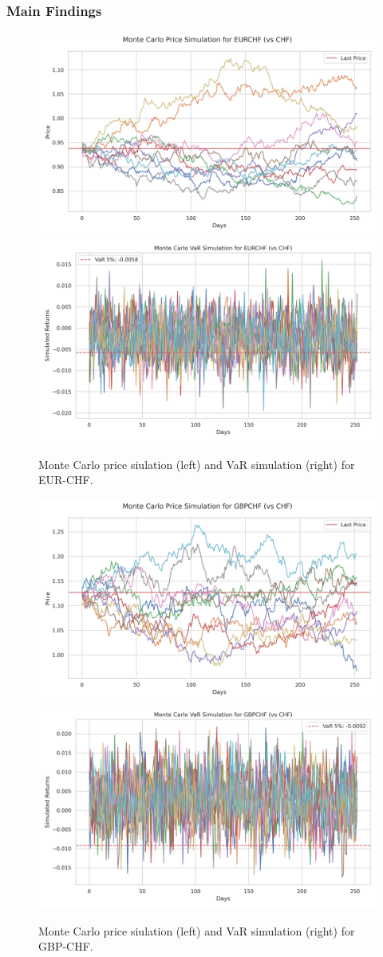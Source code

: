 \documentclass[10pt]{beamer}
\begin{document}
\begin{frame}
\frametitle{Main Findings}
\begin{figure}
    \centering  \includegraphics[width=0.48\linewidth]{reports/figures/monte_carlo_price_simulation_EURCHF_vs_CHF.png}  \label{fig:monte_carlo_price_simulation_EURCHF_vs_CHF}
    \includegraphics[width=0.48\linewidth]{reports/figures/monte_carlo_var_simulation_EURCHF_vs_CHF.png}  \label{fig:monte_carlo_var_simulation_EURCHF_vs_CHF}
    \caption{\footnotesize Monte Carlo price siulation (left) and VaR simulation (right) for EUR-CHF.}
\end{figure}
\begin{figure}
    \centering   \includegraphics[width=0.48\linewidth]{reports/figures/monte_carlo_price_simulation_GBPCHF_vs_CHF.png} \label{fig:monte_carlo_price_simulation_GBPCHF_vs_CHF}
    \includegraphics[width=0.48\linewidth]{reports/figures/monte_carlo_var_simulation_GBPCHF_vs_CHF.png} \label{fig:monte_carlo_var_simulation_GBPCHF_vs_CHF}
    \caption{\footnotesize Monte Carlo price siulation (left) and VaR simulation (right) for GBP-CHF.}
\end{figure}
\end{frame}
\end{document}
